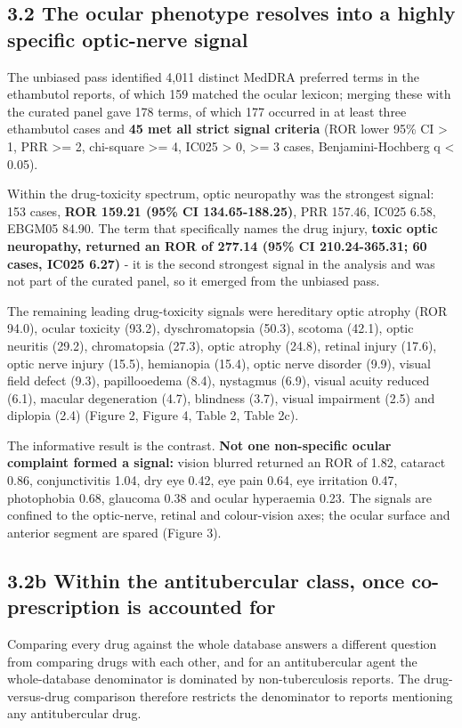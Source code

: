 \documentclass[utf8]{FrontiersinVancouver}
\begin{document}
\subsection{3.2 The ocular phenotype resolves into a highly specific optic-nerve signal}

The unbiased pass identified 4,011 distinct MedDRA preferred terms in the ethambutol reports, of which 159 matched the ocular lexicon; merging these with the curated panel gave 178 terms, of which 177 occurred in at least three ethambutol cases and \textbf{45 met all strict signal criteria} (ROR lower 95\% CI > 1, PRR >= 2, chi-square >= 4, IC025 > 0, >= 3 cases, Benjamini-Hochberg q < 0.05).

Within the drug-toxicity spectrum, optic neuropathy was the strongest signal: 153 cases, \textbf{ROR 159.21 (95\% CI 134.65-188.25)}, PRR 157.46, IC025 6.58, EBGM05 84.90. The term that specifically names the drug injury, \textbf{toxic optic neuropathy, returned an ROR of 277.14 (95\% CI 210.24-365.31; 60 cases, IC025 6.27)} - it is the second strongest signal in the analysis and was not part of the curated panel, so it emerged from the unbiased pass.

The remaining leading drug-toxicity signals were hereditary optic atrophy (ROR 94.0), ocular toxicity (93.2), dyschromatopsia (50.3), scotoma (42.1), optic neuritis (29.2), chromatopsia (27.3), optic atrophy (24.8), retinal injury (17.6), optic nerve injury (15.5), hemianopia (15.4), optic nerve disorder (9.9), visual field defect (9.3), papillooedema (8.4), nystagmus (6.9), visual acuity reduced (6.1), macular degeneration (4.7), blindness (3.7), visual impairment (2.5) and diplopia (2.4) (Figure 2, Figure 4, Table 2, Table 2c).

The informative result is the contrast. \textbf{Not one non-specific ocular complaint formed a signal:} vision blurred returned an ROR of 1.82, cataract 0.86, conjunctivitis 1.04, dry eye 0.42, eye pain 0.64, eye irritation 0.47, photophobia 0.68, glaucoma 0.38 and ocular hyperaemia 0.23. The signals are confined to the optic-nerve, retinal and colour-vision axes; the ocular surface and anterior segment are spared (Figure 3).

\subsection{3.2b Within the antitubercular class, once co-prescription is accounted for}

Comparing every drug against the whole database answers a different question from comparing drugs with each other, and for an antitubercular agent the whole-database denominator is dominated by non-tuberculosis reports. The drug-versus-drug comparison therefore restricts the denominator to reports mentioning any antitubercular drug.
\end{document}
